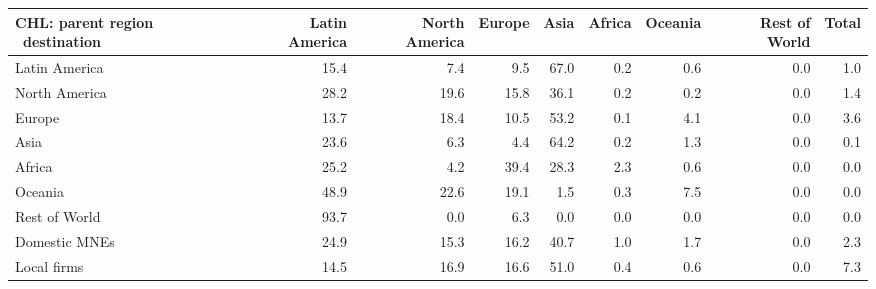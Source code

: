 \begin{tabular}{lrrrrrrrr}
\toprule
CHL: parent region \ destination & Latin America & North America & Europe & Asia & Africa & Oceania & Rest of World & Total \\
\midrule
Latin America & 15.4 & 7.4 & 9.5 & 67.0 & 0.2 & 0.6 & 0.0 & 1.0 \\
North America & 28.2 & 19.6 & 15.8 & 36.1 & 0.2 & 0.2 & 0.0 & 1.4 \\
Europe & 13.7 & 18.4 & 10.5 & 53.2 & 0.1 & 4.1 & 0.0 & 3.6 \\
Asia & 23.6 & 6.3 & 4.4 & 64.2 & 0.2 & 1.3 & 0.0 & 0.1 \\
Africa & 25.2 & 4.2 & 39.4 & 28.3 & 2.3 & 0.6 & 0.0 & 0.0 \\
Oceania & 48.9 & 22.6 & 19.1 & 1.5 & 0.3 & 7.5 & 0.0 & 0.0 \\
Rest of World & 93.7 & 0.0 & 6.3 & 0.0 & 0.0 & 0.0 & 0.0 & 0.0 \\
Domestic MNEs & 24.9 & 15.3 & 16.2 & 40.7 & 1.0 & 1.7 & 0.0 & 2.3 \\
Local firms & 14.5 & 16.9 & 16.6 & 51.0 & 0.4 & 0.6 & 0.0 & 7.3 \\
\bottomrule
\end{tabular}
